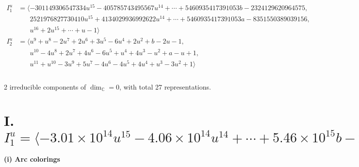 \documentclass[1p]{elsarticle_modified}
\theoremstyle{definition}
\begin{document}
\begin{align*}
I^u_{1}&=\langle 
-301149306547334 u^{15}-405785743495567 u^{14}+\cdots+5460935417391053 b-2324129620964575,\\
\phantom{I^u_{1}}&\phantom{= \langle  }2521976827730410 u^{15}+4134029936992622 u^{14}+\cdots+5460935417391053 a-8351550389039156,\\
\phantom{I^u_{1}}&\phantom{= \langle  }u^{16}+2 u^{15}+\cdots+u-1\rangle \\
I^u_{2}&=\langle 
u^9+u^8-2 u^7+2 u^6+3 u^5-6 u^4+2 u^2+b-2 u-1,\\
\phantom{I^u_{2}}&\phantom{= \langle  }u^{10}-4 u^8+2 u^7+4 u^6-6 u^5+u^4+4 u^3- u^2+a- u+1,\\
\phantom{I^u_{2}}&\phantom{= \langle  }u^{11}+u^{10}-3 u^9+5 u^7-4 u^6-4 u^5+4 u^4+u^3-3 u^2+1\rangle \\
\\
\end{align*}
\raggedright * 2 irreducible components of $\dim_{\mathbb{C}}=0$, with total 27 representations.\\
\newpage
\renewcommand{\arraystretch}{1}
\centering \section*{I. $I^u_{1}= \langle -3.01\times10^{14} u^{15}-4.06\times10^{14} u^{14}+\cdots+5.46\times10^{15} b-2.32\times10^{15},\;2.52\times10^{15} u^{15}+4.13\times10^{15} u^{14}+\cdots+5.46\times10^{15} a-8.35\times10^{15},\;u^{16}+2 u^{15}+\cdots+u-1 \rangle$}
\flushleft \textbf{(i) Arc colorings}\\
\end{document}
